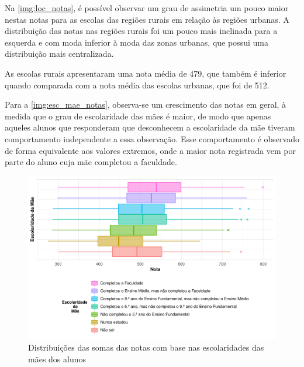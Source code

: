 Na \autoref{img:loc_notas}, é possível observar um grau de assimetria um pouco maior nestas notas para as escolas
das regiões rurais em relação às regiões urbanas. A distribuição das notas nas regiões rurais foi um pouco mais inclinada
para a esquerda e com moda inferior à moda das zonas urbanas, que possui uma distribuição mais centralizada.

As escolas rurais apresentaram uma nota média de 479, que também é inferior quando comparada com a nota média das
escolas urbanas, que foi de 512.


Para a \autoref{img:esc_mae_notas}, observa-se um crescimento das notas em geral, à medida que o grau de escolaridade
das mães é maior, de modo que apenas aqueles alunos que responderam que desconhecem a escolaridade da mãe
tiveram comportamento independente a essa observação. Esse comportamento é observado de forma equivalente aos valores extremos,
onde a maior nota registrada vem por parte do aluno cuja mãe completou a faculdade.
\newpage

\begin{figure}[h]
    \caption{Distribuições das somas das notas com base nas escolaridades 
    das mães dos alunos\label{img:esc_mae_notas}}
    \begin{center}
        \includegraphics[width=16cm]{img/esc_mae_notas.pdf}
    \end{center}
\end{figure}





